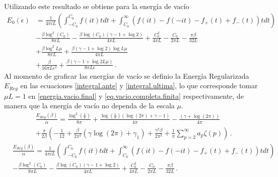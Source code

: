 Utilizando este resultado se obtiene para la energía de vacío
\begin{align}
\label{eq.vacio.completa.finita}
\nonumber
	E _0 (\epsilon )&=  
		\frac{1}{4 \pi i L} 
		\left(
			\int _{-C _0} ^{C _0} f (i t) t dt
			+ \int _{C _0} ^{\infty}  \left( f(i t) - f(-i t) - f _{+} (t) + f _{-} (t) \right) t dt
			\right) 
\\ \nonumber &
	- \frac{\beta \log ^2 (C _0) }{8 \pi L}
	-\frac{\beta \log (C _0) (\gamma -1 + \log 2  )}{4 \pi L}
	+ \frac{C _0 ^2}{4 \pi L}
	- \frac{C _0}{2 \pi L}
	- \frac{\pi \beta}{32 L}
\\ \nonumber &
	+ \frac{\beta \log ^2 L \mu}{8 \pi L}
	+ \frac{\beta (\gamma -1 + \log 2  )  \log L \mu}{4 \pi L}
\\ &
	+ \frac{\beta}{16 \pi L \epsilon ^2}
	+ \frac{\beta (\gamma -1 + \log 2 L \mu )}{8  \pi L \epsilon }
	\, .
\end{align}
Al momento de graficar las energías de vacío se definio la Energía Regularizada $E _{Reg}$ en las ecuaciones \eqref{integral.ante} y \eqref{integral.ultima}, lo que corresponde tomar $\mu L = 1$ en     \eqref{energia.vacio.final} y \eqref{eq.vacio.completa.finita} respectivamente, de manera que la energía de vacío no dependa de la escala $\mu$.
\begin{align}
\nonumber
&
	\frac{E_ {Reg} ( \beta )}{\alpha}  =
	\frac{ \log ^2 \left( \frac{ 1 }{\pi} \right)}{8 \pi}  +
		\frac{ 
			 \log \left( \frac{ 1 }{\pi}\right)
				( \log (2 \pi ) + \gamma -1 )}  
			{4 \pi }  
	- \frac{ (\gamma + \log (2 \pi ) )}{4 \pi}
\\[5pt]
&
+
	\frac{\pi}{2 \beta}  
			\left(
				- \frac{1}{12} +
				\frac{\beta}{2 \pi ^2} 
				\left(
					\gamma \log (2 \pi)
					+ \gamma _1
					\right) +
								\frac{\gamma ^2 \beta }{2 \pi ^2} +
								\frac{1}{\pi} \sum _{p=2} ^{\infty}
								a_p \zeta (p) 
							\right) 
\, .
\label{integral.ante}
\end{align}
\begin{align}
\nonumber
&
	\frac{E _{Reg} ( \beta ) }{\alpha} =  
		\frac{1}{4 \pi i L} 
		\left(
			\int _{-C _0} ^{C _0} f (i t) t dt
			+ \int _{C _0} ^{\infty}  \left( f(i t) - f(-i t) - f _{+} (t) + f _{-} (t) \right) t dt
			\right) 
\\  &
	- \frac{\beta \log ^2 (C _0) }{8 \pi L}
	-\frac{\beta \log (C _0) (\gamma -1 + \log 2  )}{4 \pi L}
	+ \frac{C _0 ^2}{4 \pi L}
	- \frac{C _0}{2 \pi L}
	- \frac{\pi \beta}{32 L}
	\, .
\label{integral.ultima}
\end{align}

